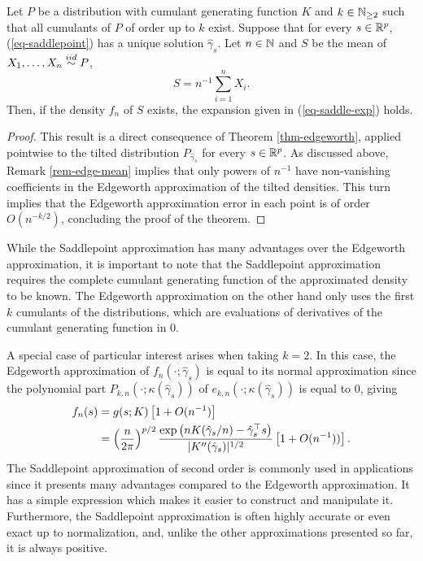 \begin{theorem}
    Let $P$ be a distribution with cumulant generating function $K$ and $k \in \mathbb{N}_{\geq 2}$ such that all cumulants of $P$ of order up to $k$ exist. Suppose that for every $s \in {\mathbb{R}^p}$, (\ref{eq-saddlepoint}) has a unique solution $\hat\gamma_s$. Let $n \in \mathbb{N}$ and $S$ be the mean of $X_1, \ldots, X_n \stackrel{iid}{\sim} P$,
    \begin{equation*}
        S = n^{-1} \sum_{i=1}^n X_i.
    \end{equation*}
    Then, if the density $f_n$ of $S$ exists, the expansion given in (\ref{eq-saddle-exp}) holds.
\end{theorem}
\begin{proof}
    This result is a direct consequence of Theorem \ref{thm-edgeworth}, applied pointwise to the tilted distribution $P_{\hat\gamma_s}$ for every $s \in {\mathbb{R}^p}$. As discussed above, Remark \ref{rem-edge-mean} implies that only powers of $n^{-1}$ have non-vanishing coefficients in the Edgeworth approximation of the tilted densities. This turn implies that the Edgeworth approximation error in each point is of order $O(n^{-k/2})$, concluding the proof of the theorem.
\end{proof}

While the Saddlepoint approximation has many advantages over the Edgeworth approximation, it is important to note that the Saddlepoint approximation requires the complete cumulant generating function of the approximated density to be known. The Edgeworth approximation on the other hand only uses the first $k$ cumulants of the distributions, which are evaluations of derivatives of the cumulant generating function in 0. 

A special case of particular interest arises when taking $k = 2$. In this case, the Edgeworth approximation of $f_n(\cdot; \hat\gamma_s)$ is equal to its normal approximation since the polynomial part $P_{k, n}(\cdot; \kappa(\hat\gamma_s))$ of $e_{k,n}(\cdot; \kappa(\hat\gamma_s))$ is equal to 0, giving
\begin{align} \label{eq-saddle-3}
    f_n(s) &= g(s; K)\left[1 + O(n^{-1})\right]\nonumber\\
    &= \left(\frac{n}{2\pi}\right)^{p/2} \frac{\exp\left(nK(\hat\gamma_s / n) - \hat\gamma_s^\top s\right)}{|K''(\hat\gamma_s)|^{1/2}} \left[1 + O(n^{-1}))\right].
\end{align}
The Saddlepoint approximation of second order is commonly used in applications since it presents many advantages compared to the Edgeworth approximation. It has a simple expression which makes it easier to construct and manipulate it. Furthermore, the Saddlepoint approximation is often highly accurate or even exact up to normalization, and, unlike the other approximations presented so far, it is always positive.


